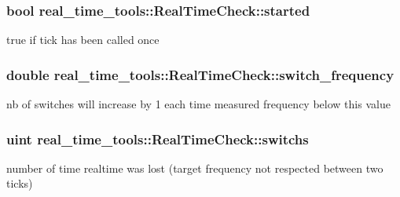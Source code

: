 \subsubsection[{\texorpdfstring{started}{started}}]{\setlength{\rightskip}{0pt plus 5cm}bool real\+\_\+time\+\_\+tools\+::\+Real\+Time\+Check\+::started\hspace{0.3cm}{\ttfamily [private]}}\hypertarget{classreal__time__tools_1_1RealTimeCheck_a21b5703a3c61b09955d94d06a3562667}{}\label{classreal__time__tools_1_1RealTimeCheck_a21b5703a3c61b09955d94d06a3562667}
true if tick has been called once 
\subsubsection[{\texorpdfstring{switch\+\_\+frequency}{switch_frequency}}]{\setlength{\rightskip}{0pt plus 5cm}double real\+\_\+time\+\_\+tools\+::\+Real\+Time\+Check\+::switch\+\_\+frequency\hspace{0.3cm}{\ttfamily [private]}}\hypertarget{classreal__time__tools_1_1RealTimeCheck_a235895032a789539a8ba957caac621ec}{}\label{classreal__time__tools_1_1RealTimeCheck_a235895032a789539a8ba957caac621ec}
nb of switches will increase by 1 each time measured frequency below this value 
\subsubsection[{\texorpdfstring{switchs}{switchs}}]{\setlength{\rightskip}{0pt plus 5cm}uint real\+\_\+time\+\_\+tools\+::\+Real\+Time\+Check\+::switchs\hspace{0.3cm}{\ttfamily [private]}}\hypertarget{classreal__time__tools_1_1RealTimeCheck_acc235579eeb245f043fd188790540fa9}{}\label{classreal__time__tools_1_1RealTimeCheck_acc235579eeb245f043fd188790540fa9}
number of time realtime was lost (target frequency not respected between two ticks) 

